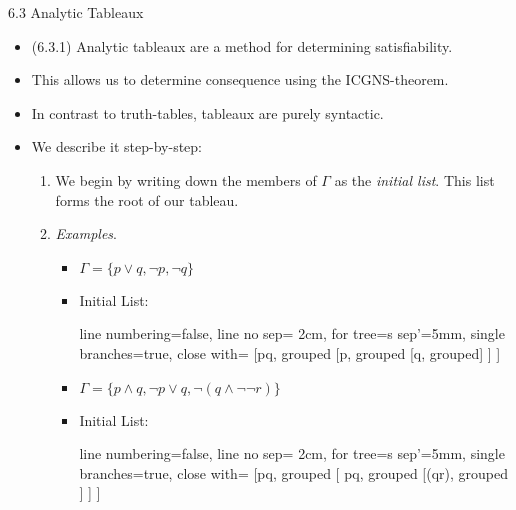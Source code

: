 \documentclass[../slides.tex]{subfiles}
\begin{document}
\begin{frame}{6.3 Analytic Tableaux}

	\begin{itemize}
		
		\item (6.3.1) Analytic tableaux are a method for determining satisfiability. 
		
		\item This allows us to determine consequence using the ICGNS-theorem. 
		
		\item In contrast to truth-tables, tableaux are purely syntactic.
		
		\item We describe it step-by-step:
		
		\begin{enumerate}[1.]
		
			\item We begin by writing down the members of $\Gamma$ as the \emph{initial list}. This list forms the root of our tableau.
			
			\item[] \emph{Examples}.
			
			\begin{itemize}

				\item $\Gamma=\{p\lor q, \neg p, \neg q\}$

				\item[] Initial List: 

					\begin{prooftree}
						{
						line numbering=false,
						line no sep= 2cm,
						for tree={s sep'=5mm},
						single branches=true,
						close with=\xmark
						}
						[p\lor q, grouped [\neg p, grouped [\neg q, grouped] ] ]
					\end{prooftree}
					
				\item $\Gamma=\{p\land q, \neg p\lor q, \neg (q\land \neg \neg r)\}$

					\item[] Initial List:

					\begin{prooftree}
					{
					line numbering=false,
					line no sep= 2cm,
					for tree={s sep'=5mm},
					single branches=true,
					close with=\xmark
					}
					[p\land q, grouped [ \neg p\lor q, grouped [\neg (q\land \neg \neg r), grouped ] ] ]
					\end{prooftree}
					

			\end{itemize}
		
		\end{enumerate}
	
	\end{itemize}

\end{frame}
\end{document}
